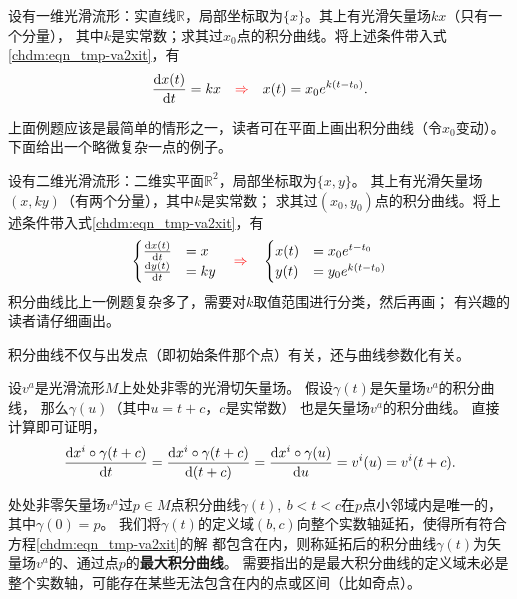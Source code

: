 \begin{example}
    设有一维光滑流形：实直线$\mathbb{R}$，局部坐标取为$\{x\}$。其上有光滑矢量场$k x$（只有一个分量），
    其中$k$是实常数；求其过$x_0$点的积分曲线。将上述条件带入式\eqref{chdm:eqn_tmp-va2xit}，有
    \begin{equation}
        \frac{{\rm d} x(t)}{{\rm d} t}= k x 
        \quad {\color{red}\Rightarrow} \quad
        x(t)= x_0 e^{k(t-t_0)}.
    \end{equation}
\end{example}
上面例题应该是最简单的情形之一，读者可在平面上画出积分曲线（令$x_0$变动）。
下面给出一个略微复杂一点的例子。
\begin{example}
    设有二维光滑流形：二维实平面$\mathbb{R}^2$，局部坐标取为$\{x,y\}$。
    其上有光滑矢量场$(x,ky)$（有两个分量），其中$k$是实常数；
    求其过$(x_0,y_0)$点的积分曲线。将上述条件带入式\eqref{chdm:eqn_tmp-va2xit}，有
    \begin{equation}
        \begin{cases}
            \frac{{\rm d} x(t)}{{\rm d} t}& =  x \\
            \frac{{\rm d} y(t)}{{\rm d} t}&= k y
        \end{cases}
        \quad {\color{red}\Rightarrow} \quad
        \begin{cases}
            x(t)& =  x_0 e^{t-t_0} \\
            y(t)& =  y_0 e^{k(t-t_0)} 
        \end{cases}
    \end{equation}
积分曲线比上一例题复杂多了，需要对$k$取值范围进行分类，然后再画；
有兴趣的读者请仔细画出。
\end{example}

积分曲线不仅与出发点（即初始条件那个点）有关，还与曲线参数化有关。
\begin{example}
    设$v^a$是光滑流形$M$上处处非零的光滑切矢量场。
    假设$\gamma(t)$是矢量场$v^a$的积分曲线，
    那么$\gamma(u)$（其中$u=t+c$，$c$是实常数）
    也是矢量场$v^a$的积分曲线。
直接计算即可证明，
    \begin{equation}
        \frac{{\rm d} x^i\circ\gamma(t+c)}{{\rm d} t} = 
        \frac{{\rm d} x^i\circ\gamma(t+c)}{{\rm d} (t+c)}=
        \frac{{\rm d} x^i\circ\gamma(u)}{{\rm d} u}=v^i(u)=v^i(t+c).
    \end{equation}
\end{example}

处处非零矢量场$v^a$过$p\in M$点积分曲线$\gamma(t),\ b<t<c$在$p$点小邻域内是唯一的，其中$\gamma(0)=p$。
我们将$\gamma(t)$的定义域$(b,c)$向整个实数轴延拓，使得所有符合方程\eqref{chdm:eqn_tmp-va2xit}的解
都包含在内，则称延拓后的积分曲线$\gamma(t)$为矢量场$v^a$的、通过点$p$的\textbf{最大积分曲线}。
需要指出的是最大积分曲线的定义域未必是整个实数轴，可能存在某些无法包含在内的点或区间（比如奇点）。

